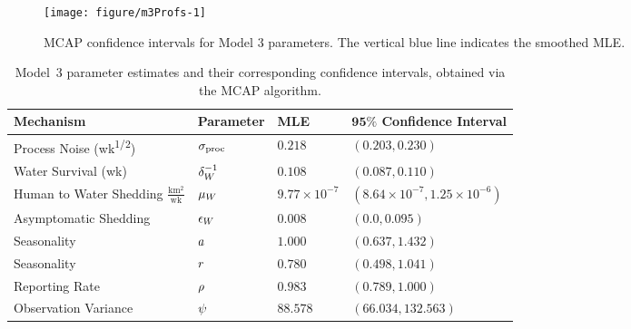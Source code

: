 \begin{figure}[ht]
\begin{knitrout}
\color{fgcolor}

{\centering \texttt{[image: figure/m3Profs-1]} 

}


\end{knitrout}
\caption[MCAP confidence intervals for Model 3 parameters.]{\label{fig:m3Profs}MCAP confidence intervals for Model 3 parameters. The vertical blue line indicates the smoothed MLE.}
\end{figure}

\begin{table}[!h]
\centering
\caption[Model~3 parameter estimates and confidence intervals.]{\label{tab:mod3CI}Model~3 parameter estimates and their corresponding confidence intervals, obtained via the MCAP algorithm.}
\vspace{2mm}
\begin{tabular}{|L{3.60cm}|C{2.1cm}|C{1.9cm}|C{4.3cm}|}
\hline
\centering \textbf{Mechanism} & \textbf{Parameter} & \textbf{MLE} & $\bm{95\%}$ \textbf{Confidence Interval} \\
\hline
\hline

 Process Noise {\footnotesize (wk\textsuperscript{1/2})} & $\sigma_{\mathrm{proc}}$ & $0.218$
   &
  $(0.203, 0.230)$
\\
\hline

 Water Survival {\footnotesize (wk)} & $\delta_W^{-1}$ & $0.108$
   &
  $(0.087, 0.110)$
\\
\hline

 Human to Water Shedding {\footnotesize $\frac{\mathrm{km^2}}{\mathrm{wk}}$} & $\mu_W$ & $\ensuremath{9.77\times 10^{-7}}$
   &
  $(\ensuremath{8.64\times 10^{-7}}, \ensuremath{1.25\times 10^{-6}})$
\\
\hline

 Asymptomatic Shedding & $\epsilon_{W}$ & $0.008$
   &
  $(0.0, 0.095)$
\\
\hline

 Seasonality & $a$ & $1.000$
   &
  $(0.637, 1.432)$
\\
\hline

 Seasonality & $r$ & $0.780$
   &
  $(0.498, 1.041)$
\\
\hline

 Reporting Rate & $\rho$ & $0.983$
   &
  $(0.789, 1.000)$
\\
\hline

 Observation Variance & $\psi$ & $88.578$
   &
  $(66.034, 132.563)$
\\
\hline

\end{tabular}
\end{table}

